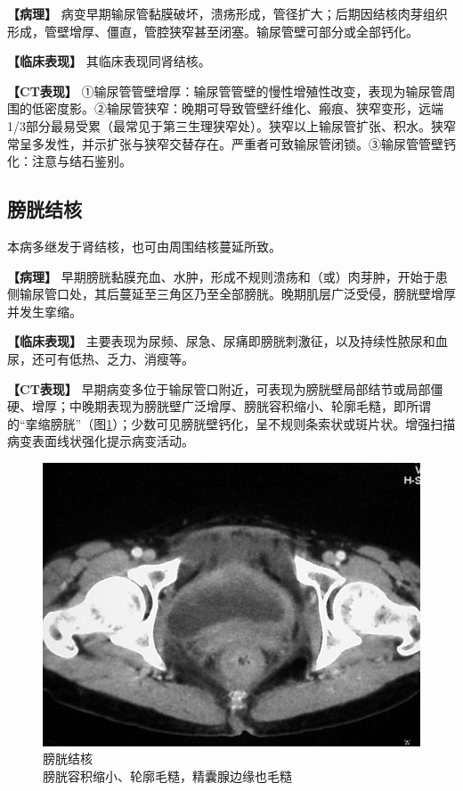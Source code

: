 \textbf{【病理】}
病变早期输尿管黏膜破坏，溃疡形成，管径扩大；后期因结核肉芽组织形成，管壁增厚、僵直，管腔狭窄甚至闭塞。输尿管壁可部分或全部钙化。

\textbf{【临床表现】} 其临床表现同肾结核。

\textbf{【CT表现】}
①输尿管管壁增厚：输尿管管壁的慢性增殖性改变，表现为输尿管周围的低密度影。②输尿管狭窄：晚期可导致管壁纤维化、瘢痕、狭窄变形，远端1/3部分最易受累（最常见于第三生理狭窄处）。狭窄以上输尿管扩张、积水。狭窄常呈多发性，并示扩张与狭窄交替存在。严重者可致输尿管闭锁。③输尿管管壁钙化：注意与结石鉴别。

\subsection{膀胱结核}

本病多继发于肾结核，也可由周围结核蔓延所致。

\textbf{【病理】}
早期膀胱黏膜充血、水肿，形成不规则溃疡和（或）肉芽肿，开始于患侧输尿管口处，其后蔓延至三角区乃至全部膀胱。晚期肌层广泛受侵，膀胱壁增厚并发生挛缩。

\textbf{【临床表现】}
主要表现为尿频、尿急、尿痛即膀胱刺激征，以及持续性脓尿和血尿，还可有低热、乏力、消瘦等。

\textbf{【CT表现】}
早期病变多位于输尿管口附近，可表现为膀胱壁局部结节或局部僵硬、增厚；中晚期表现为膀胱壁广泛增厚、膀胱容积缩小、轮廓毛糙，即所谓的“挛缩膀胱”（图\ref{fig15-13}）；少数可见膀胱壁钙化，呈不规则条索状或斑片状。增强扫描病变表面线状强化提示病变活动。

\begin{figure}[!htbp]
 \centering
 \includegraphics[width=.7\textwidth,height=\textheight,keepaspectratio]{./images/Image00328.jpg}
 \captionsetup{justification=centering}
 \caption{膀胱结核\\{\small 膀胱容积缩小、轮廓毛糙，精囊腺边缘也毛糙}}
 \label{fig15-13}
  \end{figure} 

